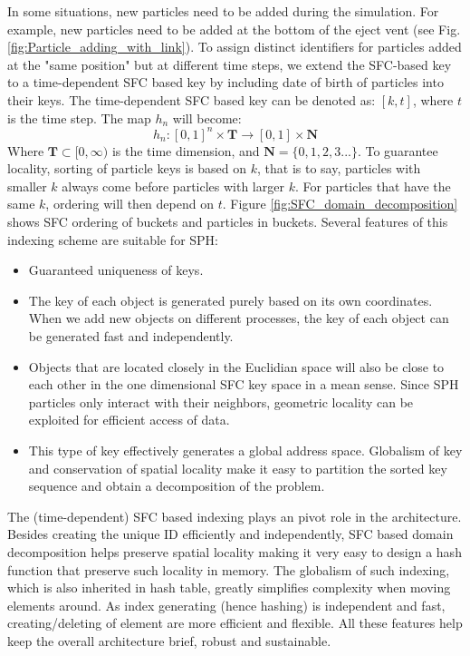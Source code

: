 In some situations, new particles need to be added during the simulation. For example, new particles need to be added at the bottom of the eject vent (see Fig. \ref{fig:Particle_adding_with_link}). To assign distinct identifiers for particles added at the "same position" but at different time steps, we extend the SFC-based key to a time-dependent SFC based key by including date of birth of particles into their keys. The time-dependent SFC based key can be denoted as: $[k,t]$, where $t$ is the time step. The map $h_n$ will become:
\begin{equation}
h_n: [0,1]^n \times \textbf{T} \rightarrow [0,1] \times \textbf{N}
\end{equation}
Where $\textbf{T} \subset [0,\infty)$ is the time dimension, and $\textbf{N}=\lbrace 0, 1, 2, 3...\rbrace$.
To guarantee locality, sorting of particle keys is based on $k$, that is to say, particles with smaller $k$ always come before particles with larger $k$. For particles that have the same $k$, ordering will then depend on $t$. Figure \ref{fig:SFC_domain_decomposition} shows SFC ordering of buckets and particles in buckets. 
Several features of this indexing scheme are suitable for SPH:
\begin{itemize}
\item Guaranteed uniqueness of keys.
\item The key of each object is generated purely based on its own coordinates. When we add new objects on different processes, the key of each object can be generated fast and independently.
\item Objects that are located closely in the Euclidian space will also be close to each other in the one dimensional SFC key space in a mean sense. Since SPH particles only interact with their neighbors, geometric locality can be exploited for efficient access of data.
\item This type of key effectively generates a global address space. Globalism of key and conservation of spatial locality make it easy to partition the sorted key sequence and obtain a decomposition of the problem.
\end{itemize}

The (time-dependent) SFC based indexing plays an pivot role in the architecture. Besides creating the unique ID efficiently and independently, SFC based domain decomposition helps preserve spatial locality making it very easy to design a hash function that preserve such locality in memory. The globalism of such indexing, which is also inherited in hash table, greatly simplifies complexity when moving elements around. As index generating (hence hashing) is independent and fast, creating/deleting of element are more efficient and flexible.
All these features help keep the overall architecture brief, robust and sustainable.


